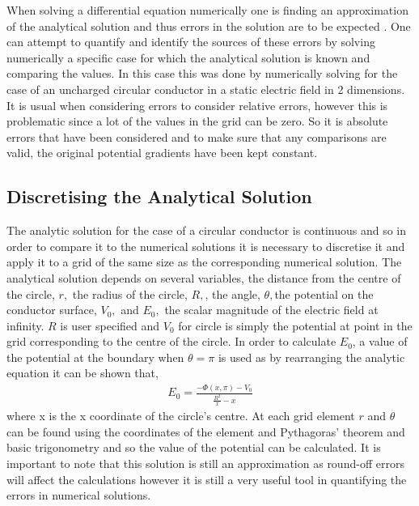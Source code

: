 \documentclass[aps,twocolumn,pre,nofootinbib,10pt]{revtex4-1}
\begin{document}
When solving a differential equation numerically one is finding an approximation of the analytical solution and thus errors in the solution are to be expected \cite{compmethods}.
One can attempt to quantify and identify the sources of these errors by solving numerically a specific case for which the analytical solution is known and comparing the values. In this case this was done by numerically solving for the case of an uncharged circular conductor in a static electric field in 2 dimensions. It is usual when considering errors to consider relative errors, however this is problematic since a lot of the values in the grid can be zero. So it is absolute errors that have been considered and to make sure that any comparisons are valid, the original potential gradients have been kept constant.

\subsection{Discretising the Analytical Solution}

The analytic solution for the case of a circular conductor is continuous and so in order to compare it to the numerical solutions it is necessary to discretise it and apply it to a grid of the same size as the corresponding numerical solution. The analytical solution depends on several variables, the distance from the centre of the circle, \(r,\) the radius of the circle, \(R,\), the angle, \(\theta,\)the potential on the conductor surface, \(V_0,\) and \(E_0,\) the scalar magnitude of the electric field at infinity. \(R\) is user specified and \(V_0\) for circle is simply the potential at point in the grid corresponding to the centre of the circle. In order to calculate \(E_0\), a value of the potential at the boundary when \(\theta = \pi\) is used as by rearranging the analytic equation it can be shown that,
\begin{gather*}
E_0 = \frac{-\Phi(x,\pi)-V_0}{\frac{R^2}{x} - x}
\end{gather*}
where x is the x coordinate of the circle's centre.
At each grid element \(r\) and \(\theta\) can be found using the coordinates of the element and Pythagoras' theorem and basic trigonometry and so the value of the potential can be calculated. It is important to note that this solution is still an approximation as round-off errors will affect the calculations however it is still a very useful tool in quantifying the errors in numerical solutions.
\end{document}
